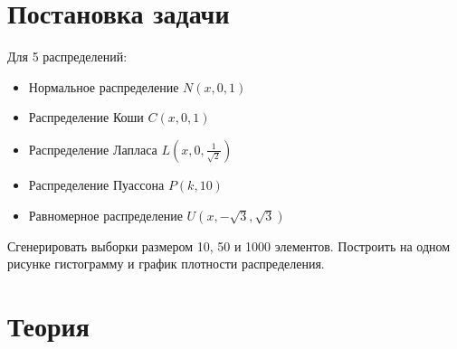\documentclass[a4paper]{article}
\begin{document}
    
    \tableofcontents
    \newpage
    \listoffigures
    \newpage
    \section{Постановка задачи}
Для 5 распределений:
    \begin{itemize}
        \item Нормальное распределение $N(x, 0, 1)$
        \item Распределение Коши $C(x, 0, 1)$
        \item Распределение Лапласа $L\left(x, 0, \frac{1}{\sqrt{2}}\right)$
        \item Распределение Пуассона $P(k, 10)$
        \item Равномерное распределение $U\left(x,-\sqrt{3},\sqrt{3}\right)$
    \end{itemize}
    Сгенерировать выборки размером 10, 50 и 1000 элементов.
    Построить на одном рисунке гистограмму и график плотности распределения.
    \section{Теория}
\end{document}
